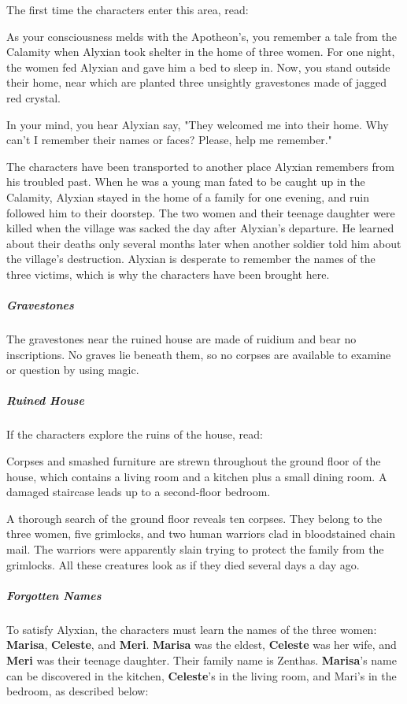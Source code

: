 \documentclass[10pt,a4paper,twoside,fancy,bg=print,twocolumn,openany,nodeprecatedcode]{dndbook}
\begin{document}
The first time the characters enter this area, read:

\begin{DndReadAloud}{}
As your consciousness melds with the Apotheon's, you remember a tale from the Calamity when Alyxian took shelter in the home of three women. For one night, the women fed Alyxian and gave him a bed to sleep in. Now, you stand outside their home, near which are planted three unsightly gravestones made of jagged red crystal.

In your mind, you hear Alyxian say, "They welcomed me into their home. Why can't I remember their names or faces? Please, help me remember."

\end{DndReadAloud}

The characters have been transported to another place Alyxian remembers from his troubled past. When he was a young man fated to be caught up in the Calamity, Alyxian stayed in the home of a family for one evening, and ruin followed him to their doorstep. The two women and their teenage daughter were killed when the village was sacked the day after Alyxian's departure. He learned about their deaths only several months later when another soldier told him about the village's destruction. Alyxian is desperate to remember the names of the three victims, which is why the characters have been brought here.

\subparagraph{Gravestones}
The gravestones near the ruined house are made of ruidium and bear no inscriptions. No graves lie beneath them, so no corpses are available to examine or question by using magic.

\subparagraph{Ruined House}
If the characters explore the ruins of the house, read:

\begin{DndReadAloud}{}
Corpses and smashed furniture are strewn throughout the ground floor of the house, which contains a living room and a kitchen plus a small dining room. A damaged staircase leads up to a second-floor bedroom.

\end{DndReadAloud}

A thorough search of the ground floor reveals ten corpses. They belong to the three women, five grimlocks, and two human warriors clad in bloodstained chain mail. The warriors were apparently slain trying to protect the family from the grimlocks. All these creatures look as if they died several days a day ago.

\subparagraph{Forgotten Names}
To satisfy Alyxian, the characters must learn the names of the three women: \textbf{Marisa}, \textbf{Celeste}, and \textbf{Meri}. \textbf{Marisa} was the eldest, \textbf{Celeste} was her wife, and \textbf{Meri} was their teenage daughter. Their family name is Zenthas. \textbf{Marisa}'s name can be discovered in the kitchen, \textbf{Celeste}'s in the living room, and Mari's in the bedroom, as described below:
\end{document}
